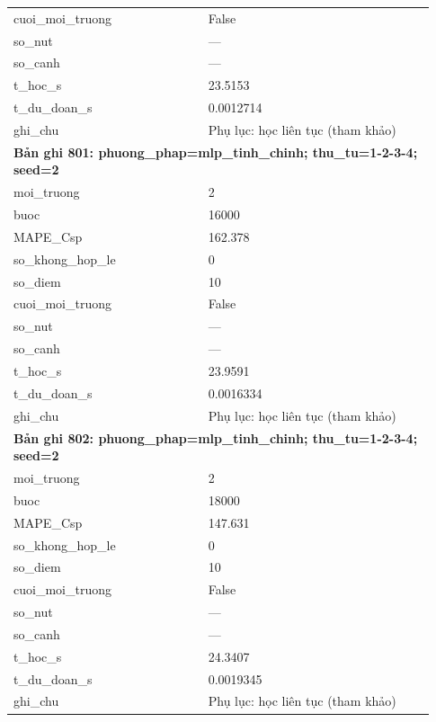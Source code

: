 \begin{longtable}{p{0.43\linewidth}p{0.50\linewidth}}
cuoi\_\allowbreak moi\_\allowbreak truong & False \\
so\_\allowbreak nut & — \\
so\_\allowbreak canh & — \\
t\_\allowbreak hoc\_\allowbreak s & 23.5153 \\
t\_\allowbreak du\_\allowbreak doan\_\allowbreak s & 0.0012714 \\
ghi\_\allowbreak chu & Phụ lục: học liên tục (tham khảo) \\
\midrule
\multicolumn{2}{p{0.95\linewidth}}{\textbf{Bản ghi 801: phuong\_phap=mlp\_tinh\_chinh; thu\_tu=1-2-3-4; seed=2}} \\
moi\_\allowbreak truong & 2 \\
buoc & 16000 \\
MAPE\_\allowbreak Csp & 162.378 \\
so\_\allowbreak khong\_\allowbreak hop\_\allowbreak le & 0 \\
so\_\allowbreak diem & 10 \\
cuoi\_\allowbreak moi\_\allowbreak truong & False \\
so\_\allowbreak nut & — \\
so\_\allowbreak canh & — \\
t\_\allowbreak hoc\_\allowbreak s & 23.9591 \\
t\_\allowbreak du\_\allowbreak doan\_\allowbreak s & 0.0016334 \\
ghi\_\allowbreak chu & Phụ lục: học liên tục (tham khảo) \\
\midrule
\multicolumn{2}{p{0.95\linewidth}}{\textbf{Bản ghi 802: phuong\_phap=mlp\_tinh\_chinh; thu\_tu=1-2-3-4; seed=2}} \\
moi\_\allowbreak truong & 2 \\
buoc & 18000 \\
MAPE\_\allowbreak Csp & 147.631 \\
so\_\allowbreak khong\_\allowbreak hop\_\allowbreak le & 0 \\
so\_\allowbreak diem & 10 \\
cuoi\_\allowbreak moi\_\allowbreak truong & False \\
so\_\allowbreak nut & — \\
so\_\allowbreak canh & — \\
t\_\allowbreak hoc\_\allowbreak s & 24.3407 \\
t\_\allowbreak du\_\allowbreak doan\_\allowbreak s & 0.0019345 \\
ghi\_\allowbreak chu & Phụ lục: học liên tục (tham khảo) \\

\end{longtable}
